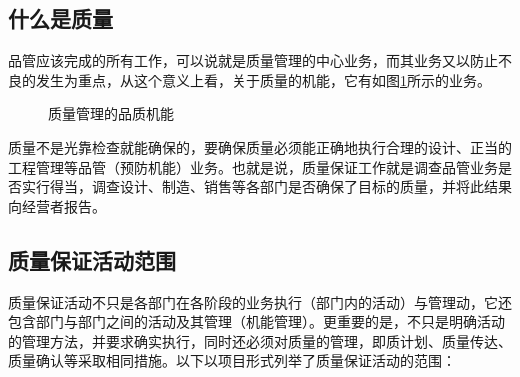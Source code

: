 \subsection {什么是质量}

    品管应该完成的所有工作，可以说就是质量管理的中心业务，而其业务又以防止不良的发生为重点，从这个意义上看，关于质量的机能，它有如图\ref{fig:qcMech}所示的业务。

    \begin{figure}[h]
        \centering
        \caption{质量管理的品质机能}    \label{fig:qcMech}
    \end{figure}

    质量不是光靠检查就能确保的，要确保质量必须能正确地执行合理的设计、正当的工程管理等品管（预防机能）业务。也就是说，质量保证工作就是调查品管业务是否实行得当，调查设计、制造、销售等各部门是否确保了目标的质量，并将此结果向经营者报告。

\subsection {质量保证活动范围}

  质量保证活动不只是各部门在各阶段的业务执行（部门内的活动）与管理动，它还包含部门与部门之间的活动及其管理（机能管理）。更重要的是，不只是明确活动的管理方法，并要求确实执行，同时还必须对质量的管理，即质计划、质量传达、质量确认等采取相同措施。以下以项目形式列举了质量保证活动的范围：

